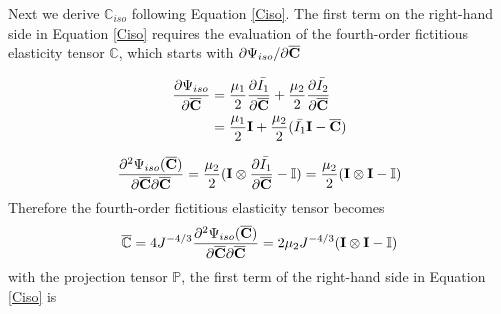 Next we derive $\mathbb{C}_{iso}$ following Equation \ref{Ciso}. The first term on the right-hand side in Equation \ref{Ciso} requires the evaluation of the fourth-order fictitious elasticity tensor $\mathbb{C}$, which starts with ${\partial{\Psi_{iso}}}/{\partial{\overline{\bold{C}}}}$

\begin{equation}
\begin{split}
\frac{\partial{\Psi_{iso}}}{\partial{\overline{\bold{C}}}} &= \frac{\mu_1}{2}\frac{\partial{\bar{I_1}}}{\partial{\overline{\bold{C}}}} +  \frac{\mu_2}{2}\frac{\partial{\bar{I_2}}}{\partial{\overline{\bold{C}}}} \\
&= \frac{\mu_1}{2}\bold{I} + \frac{\mu_2}{2}(\bar{I_1}\bold{I} - \overline{\bold{C}})
\end{split}
\end{equation}

\begin{equation}
\frac{\partial^2\Psi_{iso}(\overline{\bold{C}})}{\partial\overline{\bold{C}}\partial\overline{\bold{C}}} = 
\frac{\mu_2}{2}(\bold{I} \otimes \frac{\partial{\bar{I_1}}}{\partial{\overline{\bold{C}}}} - \mathbb{I}) = \frac{\mu_2}{2}(\bold{I} \otimes \bold{I} - \mathbb{I})
\end{equation}
Therefore the fourth-order fictitious elasticity tensor becomes
\begin{equation}
\overline{\mathbb{C}} = 4J^{-4/3}\frac{\partial^2\Psi_{iso}(\overline{\bold{C}})}{\partial{\overline{\bold{C}}}{\partial{\overline{\bold{C}}}}} = 2\mu_2{J^{-4/3}}(\bold{I} \otimes \bold{I} - \mathbb{I})
\end{equation}
with the projection tensor $\mathbb{P}$, the first term of the right-hand side in Equation \ref{Ciso} is

